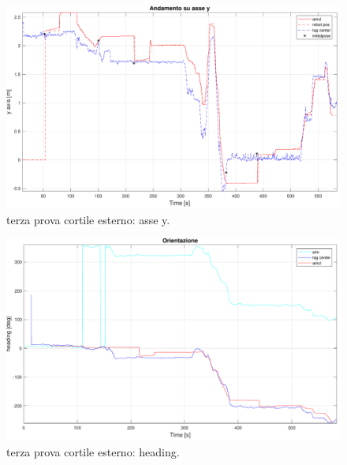 \begin{figure}[] 
	\centering    
	\includegraphics[width=.8\textwidth]{figs/grafici_cortile/prova3/figure3.pdf}
	\caption{terza prova cortile esterno: asse y.}
	\label{fig. y terza prova esterno}
\end{figure}

\begin{figure}[] 
	\centering    
	\includegraphics[width=.8\textwidth]{figs/grafici_cortile/prova3/figure4.pdf}
	\caption{terza prova cortile esterno: heading.}
	\label{fig. or terza prova esterno}
\end{figure}


